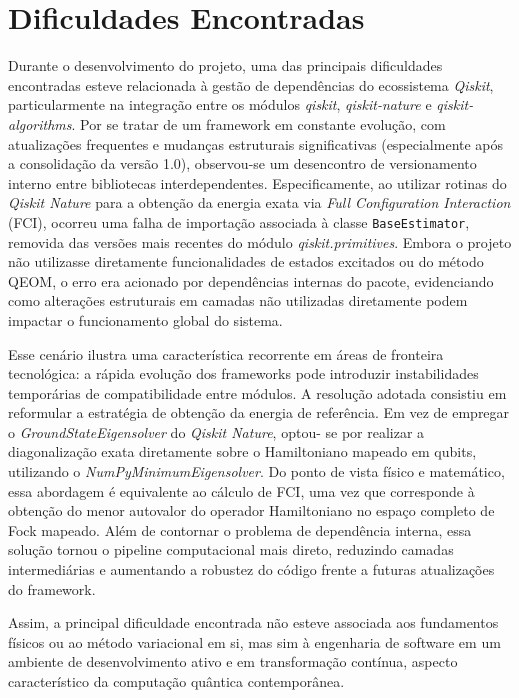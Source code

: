 \section{Dificuldades Encontradas}

Durante o desenvolvimento do projeto, uma das principais dificuldades 
encontradas esteve relacionada à gestão de dependências do ecossistema 
\textit{Qiskit}, particularmente na integração entre os módulos 
\textit{qiskit}, \textit{qiskit-nature} e \textit{qiskit-algorithms}. Por se 
tratar de um framework em constante evolução, com atualizações frequentes e 
mudanças estruturais significativas (especialmente após a consolidação da 
versão 1.0), observou-se um desencontro de versionamento interno entre 
bibliotecas interdependentes.
Especificamente, ao utilizar rotinas do \textit{Qiskit Nature} para a 
obtenção da energia exata via \textit{Full Configuration Interaction} (FCI), 
ocorreu uma falha de importação associada à classe \texttt{BaseEstimator}, 
removida das versões mais recentes do módulo \textit{qiskit.primitives}. 
Embora o projeto não utilizasse diretamente funcionalidades de estados 
excitados ou do método QEOM, o erro era acionado por dependências internas 
do pacote, evidenciando como alterações estruturais em camadas não 
utilizadas diretamente podem impactar o funcionamento global do sistema.

Esse cenário ilustra uma característica recorrente em áreas de fronteira 
tecnológica: a rápida evolução dos frameworks pode introduzir instabilidades 
temporárias de compatibilidade entre módulos. A resolução adotada consistiu 
em reformular a estratégia de obtenção da energia de referência. Em vez de 
empregar o \textit{GroundStateEigensolver} do \textit{Qiskit Nature}, optou-
se por realizar a diagonalização exata diretamente sobre o Hamiltoniano 
mapeado em qubits, utilizando o \textit{NumPyMinimumEigensolver}. 
Do ponto de vista físico e matemático, essa abordagem é equivalente ao 
cálculo de FCI, uma vez que corresponde à obtenção do menor autovalor do 
operador Hamiltoniano no espaço completo de Fock mapeado. Além de contornar 
o problema de dependência interna, essa solução tornou o pipeline 
computacional mais direto, reduzindo camadas intermediárias e aumentando a 
robustez do código frente a futuras atualizações do framework.

Assim, a principal dificuldade encontrada não esteve associada aos 
fundamentos físicos ou ao método variacional em si, mas sim à engenharia de 
software em um ambiente de desenvolvimento ativo e em transformação contínua,
aspecto característico da computação quântica contemporânea.